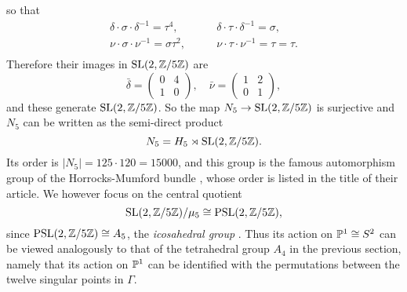 so that
\begin{equation*}
\begin{split}
\delta\cdot\sigma\cdot\delta^{-1} = \tau^{4},\qquad &\delta\cdot\tau\cdot\delta^{-1} = \sigma,\\
\nu\cdot\sigma\cdot\nu^{-1} = \sigma\tau^{2},\qquad
&\nu\cdot\tau\cdot\nu^{-1} = \tau = \tau.\\
\end{split}
\end{equation*}
Therefore their images in $\operatorname{SL}(2,\mathbb{Z}/5\mathbb{Z})$ are
\begin{equation*}
	\bar{\delta} = \begin{pmatrix}
	0 & 4\\
	1 & 0
	\end{pmatrix},
	\quad
	\bar{\nu} = \begin{pmatrix}
	1 & 2\\
	0 & 1
	\end{pmatrix},
\end{equation*}
and these generate $\operatorname{SL}(2,\mathbb{Z}/5\mathbb{Z})$. So the map $N_{5} \rightarrow \operatorname{SL}(2,\mathbb{Z}/5\mathbb{Z})$ is surjective and $N_{5}$ can be written as the semi-direct product
\begin{equation*}
	N_{5} = H_{5} \rtimes \operatorname{SL}(2,\mathbb{Z}/5\mathbb{Z}).
\end{equation*}
Its order is $|N_{5}| = 125\cdot 120 = 15000$, and this group is the famous automorphism group of the Horrocks-Mumford bundle \cite{Horrocks_1973}, whose order is listed in the title of their article. We however focus on the central quotient
\begin{equation*}
	\operatorname{SL}(2,\mathbb{Z}/5\mathbb{Z})/\mu_{5} \cong \operatorname{PSL}(2,\mathbb{Z}/5\mathbb{Z}),
\end{equation*}
since $\operatorname{PSL}(2,\mathbb{Z}/5\mathbb{Z}) \cong A_{5}$, the \emph{icosahedral group} \cite{klein2007lectures}. Thus its action on $\mathbb{P}^{1} \cong S^{2}$ can be viewed analogously to that of the tetrahedral group $A_{4}$ in the previous section, namely that its action on $\mathbb{P}^{1}$ can be identified with the permutations between the twelve singular points in $\Gamma$.